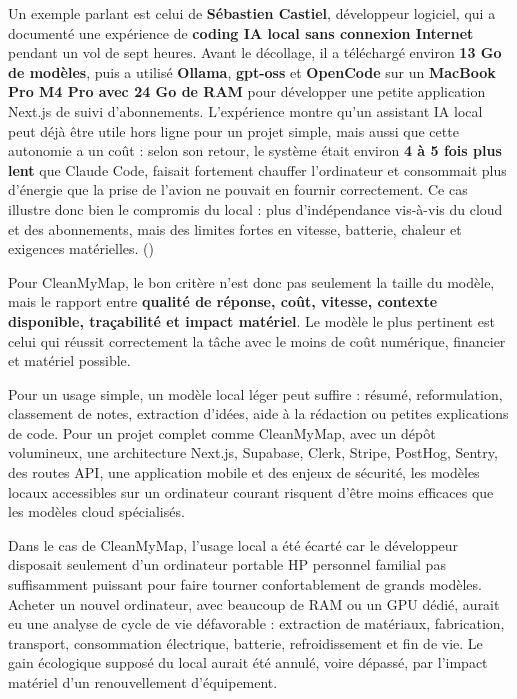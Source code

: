 \documentclass[
  10pt,
  a4paper,
  DIV=11,
  numbers=noendperiod,
  oneside]{scrreprt}
\let\oldtextbf\textbf
\renewcommand{\textbf}[1]{\oldtextbf{\textcolor{cmmnavy}{#1}}}
\begin{document}
Un exemple parlant est celui de \textbf{Sébastien Castiel}, développeur
logiciel, qui a documenté une expérience de \textbf{coding IA local sans
connexion Internet} pendant un vol de sept heures. Avant le décollage,
il a téléchargé environ \textbf{13 Go de modèles}, puis a utilisé
\textbf{Ollama}, \textbf{gpt-oss} et \textbf{OpenCode} sur un
\textbf{MacBook Pro M4 Pro avec 24 Go de RAM} pour développer une petite
application Next.js de suivi d'abonnements. L'expérience montre qu'un
assistant IA local peut déjà être utile hors ligne pour un projet
simple, mais aussi que cette autonomie a un coût : selon son retour, le
système était environ \textbf{4 à 5 fois plus lent} que Claude Code,
faisait fortement chauffer l'ordinateur et consommait plus d'énergie que
la prise de l'avion ne pouvait en fournir correctement. Ce cas illustre
donc bien le compromis du local : plus d'indépendance vis-à-vis du cloud
et des abonnements, mais des limites fortes en vitesse, batterie,
chaleur et exigences matérielles.
()

Pour CleanMyMap, le bon critère n'est donc pas seulement la taille du
modèle, mais le rapport entre \textbf{qualité de réponse, coût, vitesse,
contexte disponible, traçabilité et impact matériel}. Le modèle le plus
pertinent est celui qui réussit correctement la tâche avec le moins de
coût numérique, financier et matériel possible.

Pour un usage simple, un modèle local léger peut suffire : résumé,
reformulation, classement de notes, extraction d'idées, aide à la
rédaction ou petites explications de code. Pour un projet complet comme
CleanMyMap, avec un dépôt volumineux, une architecture Next.js,
Supabase, Clerk, Stripe, PostHog, Sentry, des routes API, une
application mobile et des enjeux de sécurité, les modèles locaux
accessibles sur un ordinateur courant risquent d'être moins efficaces
que les modèles cloud spécialisés.

Dans le cas de CleanMyMap, l'usage local a été écarté car le développeur
disposait seulement d'un ordinateur portable HP personnel familial pas
suffisamment puissant pour faire tourner confortablement de grands
modèles. Acheter un nouvel ordinateur, avec beaucoup de RAM ou un GPU
dédié, aurait eu une analyse de cycle de vie défavorable : extraction de
matériaux, fabrication, transport, consommation électrique, batterie,
refroidissement et fin de vie. Le gain écologique supposé du local
aurait été annulé, voire dépassé, par l'impact matériel d'un
renouvellement d'équipement.
\end{document}
